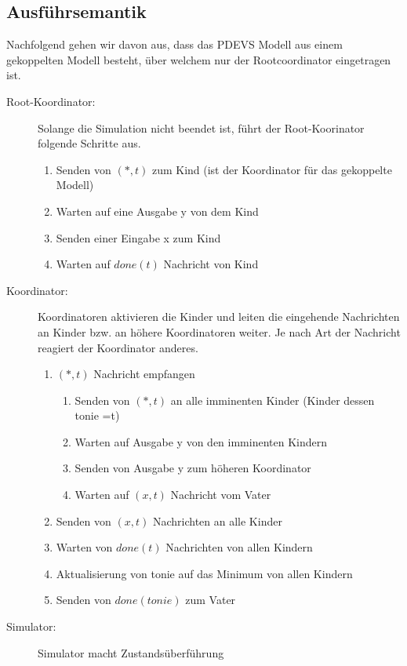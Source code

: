\documentclass[11pt, fleqn, a4paper, leqno]{scrartcl} %
\begin{document}
	\subsection{Ausführsemantik}
	Nachfolgend gehen wir davon aus, dass das PDEVS Modell aus einem gekoppelten Modell besteht, über welchem nur der Rootcoordinator eingetragen ist.
	\begin{description}
	 	\item[Root-Koordinator:] Solange die Simulation nicht beendet ist, führt der Root-Koorinator folgende Schritte aus.
	 		\begin{enumerate}
		 		\item Senden von $(*,t)$ zum Kind (ist der Koordinator für das gekoppelte Modell)
		 		\item Warten auf eine Ausgabe y von dem Kind
		 		\item Senden einer Eingabe x zum Kind
		 		\item Warten auf $done(t)$ Nachricht von Kind
	 		\end{enumerate}
	 	\item[Koordinator:] Koordinatoren aktivieren die Kinder und leiten die eingehende Nachrichten an Kinder bzw. an höhere Koordinatoren weiter. Je nach Art der Nachricht reagiert der Koordinator anderes.
	 		\begin{enumerate}
	 			\item $(*,t)$ Nachricht empfangen
	 				\begin{enumerate}
		 				\item Senden von $(*,t)$ an alle imminenten Kinder (Kinder dessen tonie =t)
		 				\item Warten auf Ausgabe y von den imminenten Kindern
		 				\item Senden von Ausgabe y zum höheren Koordinator
		 				\item Warten auf $(x,t)$ Nachricht vom Vater
	 				\end{enumerate}
	 			\item Senden von $(x,t)$ Nachrichten an alle Kinder
	 			\item Warten von $done(t)$ Nachrichten von allen Kindern
	 			\item Aktualisierung von tonie auf das Minimum von allen Kindern
	 			\item Senden von $done(tonie)$ zum Vater
	 		\end{enumerate}
	 	\item[Simulator:] Simulator macht Zustandsüberführung
	\end{description}
	
\end{document}
